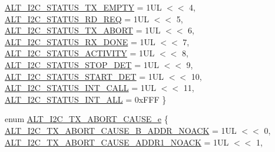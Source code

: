 \begin{DoxyCompactItemize}
\newline
\mbox{\hyperlink{group__ALT__I2C_gga229c6d995595615ca923ecc8b6490603a83021f8b43d450947fed8f4be8d8440e}{A\+L\+T\+\_\+\+I2\+C\+\_\+\+S\+T\+A\+T\+U\+S\+\_\+\+T\+X\+\_\+\+E\+M\+P\+TY}} = 1UL $<$$<$ 4, 
\mbox{\hyperlink{group__ALT__I2C_gga229c6d995595615ca923ecc8b6490603ac2e6202cb8a0e9cf804a1f6ca0dbc6d1}{A\+L\+T\+\_\+\+I2\+C\+\_\+\+S\+T\+A\+T\+U\+S\+\_\+\+R\+D\+\_\+\+R\+EQ}} = 1UL $<$$<$ 5, 
\mbox{\hyperlink{group__ALT__I2C_gga229c6d995595615ca923ecc8b6490603a10730c376d727e9a7d7597bb61c3c296}{A\+L\+T\+\_\+\+I2\+C\+\_\+\+S\+T\+A\+T\+U\+S\+\_\+\+T\+X\+\_\+\+A\+B\+O\+RT}} = 1UL $<$$<$ 6, 
\mbox{\hyperlink{group__ALT__I2C_gga229c6d995595615ca923ecc8b6490603aa7e8235315c7d8adcceb16b35ef690a4}{A\+L\+T\+\_\+\+I2\+C\+\_\+\+S\+T\+A\+T\+U\+S\+\_\+\+R\+X\+\_\+\+D\+O\+NE}} = 1UL $<$$<$ 7, 
\newline
\mbox{\hyperlink{group__ALT__I2C_gga229c6d995595615ca923ecc8b6490603a06d34863df76363170b3a9f7f31facbd}{A\+L\+T\+\_\+\+I2\+C\+\_\+\+S\+T\+A\+T\+U\+S\+\_\+\+A\+C\+T\+I\+V\+I\+TY}} = 1UL $<$$<$ 8, 
\mbox{\hyperlink{group__ALT__I2C_gga229c6d995595615ca923ecc8b6490603ad2390f0db52489a6975f2302ef0dbd70}{A\+L\+T\+\_\+\+I2\+C\+\_\+\+S\+T\+A\+T\+U\+S\+\_\+\+S\+T\+O\+P\+\_\+\+D\+ET}} = 1UL $<$$<$ 9, 
\mbox{\hyperlink{group__ALT__I2C_gga229c6d995595615ca923ecc8b6490603a0b6811cd6836045a64467646ecfc8a75}{A\+L\+T\+\_\+\+I2\+C\+\_\+\+S\+T\+A\+T\+U\+S\+\_\+\+S\+T\+A\+R\+T\+\_\+\+D\+ET}} = 1UL $<$$<$ 10, 
\mbox{\hyperlink{group__ALT__I2C_gga229c6d995595615ca923ecc8b6490603ab1c1569f2060691e867c1a53ce578525}{A\+L\+T\+\_\+\+I2\+C\+\_\+\+S\+T\+A\+T\+U\+S\+\_\+\+I\+N\+T\+\_\+\+C\+A\+LL}} = 1UL $<$$<$ 11, 
\newline
\mbox{\hyperlink{group__ALT__I2C_gga229c6d995595615ca923ecc8b6490603ab87517d404a73d013623aadecf758a7e}{A\+L\+T\+\_\+\+I2\+C\+\_\+\+S\+T\+A\+T\+U\+S\+\_\+\+I\+N\+T\+\_\+\+A\+LL}} = 0x\+F\+FF
 \}
\item 
enum \mbox{\hyperlink{group__ALT__I2C_ga321dbe61df714c442640f1c4a908aabf}{A\+L\+T\+\_\+\+I2\+C\+\_\+\+T\+X\+\_\+\+A\+B\+O\+R\+T\+\_\+\+C\+A\+U\+S\+E\+\_\+e}} \{ \newline
\mbox{\hyperlink{group__ALT__I2C_gga321dbe61df714c442640f1c4a908aabfac605a53909853df1f2716fa4d39dc37e}{A\+L\+T\+\_\+\+I2\+C\+\_\+\+T\+X\+\_\+\+A\+B\+O\+R\+T\+\_\+\+C\+A\+U\+S\+E\+\_\+B\+\_\+\+A\+D\+D\+R\+\_\+\+N\+O\+A\+CK}} = 1UL $<$$<$ 0, 
\mbox{\hyperlink{group__ALT__I2C_gga321dbe61df714c442640f1c4a908aabfa6447ffe2462fb7497d3c7f871aefc5da}{A\+L\+T\+\_\+\+I2\+C\+\_\+\+T\+X\+\_\+\+A\+B\+O\+R\+T\+\_\+\+C\+A\+U\+S\+E\+\_\+A\+D\+D\+R1\+\_\+\+N\+O\+A\+CK}} = 1UL $<$$<$ 1, 

\end{DoxyCompactItemize}
